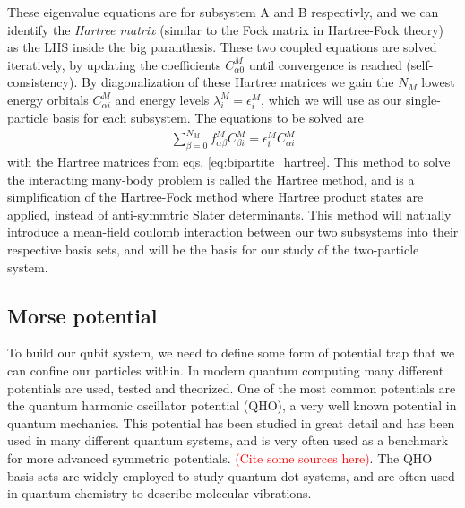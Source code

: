 \documentclass{subfiles}
\begin{document}
These eigenvalue equations are for subsystem A and B respectivly, and we can identify the \emph{Hartree matrix} (similar to the Fock matrix in Hartree-Fock theory) as the LHS inside the big paranthesis. These two coupled equations are solved iteratively, by updating the coefficients $C_{\alpha 0}^M$ until convergence is reached (self-consistency). By diagonalization of these Hartree matrices we gain the $N_M$ lowest energy orbitals $C^M_{\alpha i}$ and energy levels $\lambda^M_i=\epsilon^M_i$\cite{leinonen2024coulomb}, which we will use as our single-particle basis for each subsystem. The equations to be solved are
\begin{align*}
    \sum_{\beta=0}^{N_M} f_{\alpha\beta}^M C^M_{\beta i} = \epsilon_i^M C^M_{\alpha i}
\end{align*}
with the Hartree matrices from eqs. \ref{eq:bipartite_hartree}. This method to solve the interacting many-body problem is called the Hartree method, and is a simplification of the Hartree-Fock method where Hartree product states are applied, instead of anti-symmtric Slater determinants. This method will natually introduce a mean-field coulomb interaction between our two subsystems into their respective basis sets, and will be the basis for our study of the two-particle system.

\subsection{Morse potential}\label{sec:morse_potential}
To build our qubit system, we need to define some form of potential trap that we can confine our particles within. In modern quantum computing many different potentials are used, tested and theorized. One of the most common potentials are the quantum harmonic oscillator potential (QHO), a very well known potential in quantum mechanics. This potential has been studied in great detail and has been used in many different quantum systems, and is very often used as a benchmark for more advanced symmetric potentials. \textcolor{red}{(Cite some sources here)}. The QHO basis sets are widely employed to study quantum dot systems\cite{Yuan_2017}, and are often used in quantum chemistry to describe molecular vibrations. 
\end{document}
